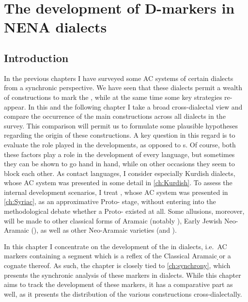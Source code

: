 













\chapter{The development of D-markers in NENA dialects} \label{ch:diachrony1}

\section{Introduction}

In the previous chapters I have surveyed some AC systems of certain  dialects from a synchronic perspective. We have seen that these dialects permit a wealth of constructions to mark the , while at the same time some key strategies re-appear. In this and the following chapter I take a broad cross-dialectal view and compare the occurrence of the main constructions across all  dialects in the survey. This comparison will permit us to formulate some plausible hypotheses regarding the origin of these constructions. A key question in this regard is to evaluate the role  played in the  developments, as opposed to s. Of course, both these factors play a role in the development of every language, but sometimes they can be shown to go hand in hand, while on other occasions they seem to block each other. As contact languages, I consider especially Kurdish dialects, whose AC system was presented in some detail in \ref{ch:Kurdish}. To assess the internal development scenarios, I treat \Syr, whose AC system was presented in \ref{ch:Syriac},  as an approximative Proto- stage, without entering into the methodological debate whether a Proto- existed at all.  Some allusions, moreover, will be made to other classical forms of Aramaic (notably \JBA), Early Jewish Neo-Aramaic (\NrT), as well as other Neo-Aramaic varieties (\WNA and \Midn).

In this chapter I concentrate on the development of the  in  dialects, i.e.\ AC markers containing a  segment which is a reflex of the Classical Aramaic \d \lnk* or a cognate thereof. As such, the chapter is closely tied to \ref{ch:synchrony}, which presents the synchronic analysis of these markers in  dialects. While this chapter aims to track the development of these markers, it has a comparative part as well, as it presents the distribution of the various constructions cross-dialectally. 

